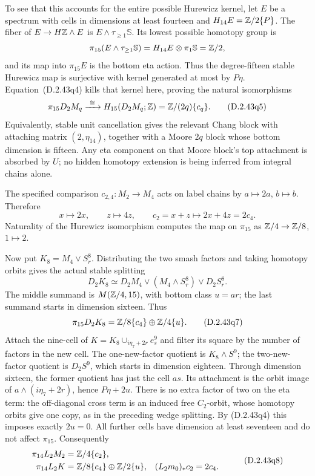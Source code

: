 To see that this accounts for the entire possible Hurewicz kernel,
let $E$ be a spectrum with cells in dimensions at least fourteen
and $H_{14}E=\mathbb Z/2\{P\}$.  The fiber of
$E\to H\mathbb Z\wedge E$ is $E\wedge\tau_{\ge1}\mathbb S$.
Its lowest possible homotopy group is
\[
 \pi_{15}(E\wedge\tau_{\ge1}\mathbb S)
       =H_{14}E\otimes\pi_1\mathbb S=\mathbb Z/2,
\]
and its map into $\pi_{15}E$ is the bottom eta action.
Thus the degree-fifteen stable Hurewicz map is surjective with
kernel generated at most by $P\eta$.  Equation~\textup{(D.2.43q4)}
kills that kernel here, proving the natural isomorphisms
\[
 \pi_{15}D_2M_q\xrightarrow{\ \cong\ }
       H_{15}(D_2M_q;\mathbb Z)=\mathbb Z/(2q)\{c_q\}.
 \tag{D.2.43q5}
\]
Equivalently, stable unit cancellation gives the relevant
Chang block with attaching matrix $(2,\eta_{14})$, together
with a Moore $2q$ block whose bottom dimension is fifteen.
Any eta component on that Moore block's top attachment is
absorbed by $U$; no hidden homotopy extension is being inferred
from integral chains alone.

The specified comparison $c_{2,4}:M_2\to M_4$ acts on label chains
by $a\mapsto2a$, $b\mapsto b$.  Therefore
\[
 x\longmapsto2x,\qquad z\longmapsto4z,
 \qquad c_2=x+z\longmapsto2x+4z=2c_4.
 \tag{D.2.43q6}
\]
Naturality of the Hurewicz isomorphism computes the map on
$\pi_{15}$ as $\mathbb Z/4\to\mathbb Z/8$, $1\mapsto2$.

Now put $K_8=M_4\vee S^8_r$.  Distributing the two smash factors
and taking homotopy orbits gives the actual stable splitting
\[
 D_2K_8\simeq D_2M_4\vee(M_4\wedge S^8_r)\vee D_2S^8_r.
\]
The middle summand is $M(\mathbb Z/4,15)$, with bottom class $u=ar$;
the last summand starts in dimension sixteen.  Thus
\[
 \pi_{15}D_2K_8=\mathbb Z/8\{c_4\}\oplus\mathbb Z/4\{u\}.
 \tag{D.2.43q7}
\]
Attach the nine-cell of
$K=K_8\cup_{i\eta_7+2r}e^9_s$ and filter its square by the
number of factors in the new cell.  The one-new-factor quotient
is $K_8\wedge S^9$; the two-new-factor quotient is $D_2S^9$,
which starts in dimension eighteen.  Through dimension sixteen,
the former quotient has just the cell $as$.  Its attachment is
the orbit image of $a\wedge(i\eta_7+2r)$, hence
$P\eta+2u$.  There is no extra factor of two on the eta term:
the off-diagonal cross term is an induced free $C_2$-orbit,
whose homotopy orbits give one copy, as in the preceding wedge
splitting.  By \textup{(D.2.43q4)} this imposes exactly $2u=0$.
All further cells have dimension at least seventeen and do not
affect $\pi_{15}$.  Consequently
\[
 \begin{aligned}
 \pi_{14}L_2M_2&=\mathbb Z/4\{c_2\},\\
 \pi_{14}L_2K&=\mathbb Z/8\{c_4\}\oplus\mathbb Z/2\{u\},
       & (L_2m_0)_*c_2&=2c_4.
 \end{aligned}
 \tag{D.2.43q8}
\]

